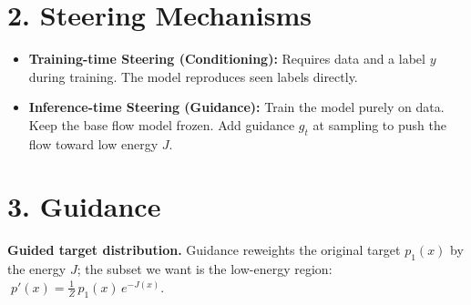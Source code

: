 \documentclass[11pt,a4paper]{article}
\begin{document}
\section*{2. Steering Mechanisms}
\begin{itemize}[leftmargin=*, nosep]
    \item \textbf{Training-time Steering (Conditioning):} Requires data and a label $y$ during training. The model reproduces seen labels directly.
    \item \textbf{Inference-time Steering (Guidance):} Train the model purely on data. Keep the base flow model frozen. Add guidance $g_t$ at sampling to push the flow toward low energy $J$.
\end{itemize}

\section*{3. Guidance}
\textbf{Guided target distribution.} Guidance reweights the original target $p_1(x)$ by the energy $J$; the subset we want is the low-energy region: $\;p'(x) = \frac{1}{Z}\, p_1(x)\, e^{-J(x)}$.
\end{document}

